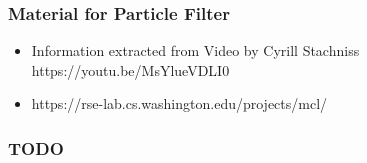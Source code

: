     
    \begin{frame}
     \frametitle{Material for Particle Filter}
    
     \begin{itemize}
     \item Information extracted from Video by Cyrill Stachniss https://youtu.be/MsYlueVDLI0
     \item https://rse-lab.cs.washington.edu/projects/mcl/
     \end{itemize}
    
    \end{frame}
    
    
    \begin{frame}
     \frametitle{TODO}
    
    
\end{frame}